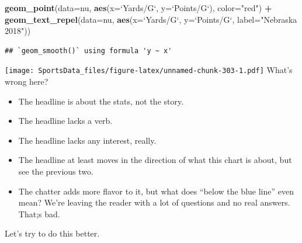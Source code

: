 \documentclass[
]{book}
\newenvironment{Shaded}{\begin{snugshade}}{\end{snugshade}}
\newcommand{\DataTypeTok}[1]{\textcolor[rgb]{0.13,0.29,0.53}{#1}}
\newcommand{\KeywordTok}[1]{\textcolor[rgb]{0.13,0.29,0.53}{\textbf{#1}}}
\newcommand{\NormalTok}[1]{#1}
\newcommand{\OperatorTok}[1]{\textcolor[rgb]{0.81,0.36,0.00}{\textbf{#1}}}
\newcommand{\StringTok}[1]{\textcolor[rgb]{0.31,0.60,0.02}{#1}}
\providecommand{\tightlist}{%
  \setlength{\itemsep}{0pt}\setlength{\parskip}{0pt}}
\begin{document}
\begin{Shaded}
\begin{Highlighting}[]
\StringTok{  }\KeywordTok{geom_point}\NormalTok{(}\DataTypeTok{data=}\NormalTok{nu, }\KeywordTok{aes}\NormalTok{(}\DataTypeTok{x=}\StringTok{`}\DataTypeTok{Yards/G}\StringTok{`}\NormalTok{, }\DataTypeTok{y=}\StringTok{`}\DataTypeTok{Points/G}\StringTok{`}\NormalTok{), }\DataTypeTok{color=}\StringTok{"red"}\NormalTok{) }\OperatorTok{+}\StringTok{ }
\StringTok{  }\KeywordTok{geom_text_repel}\NormalTok{(}\DataTypeTok{data=}\NormalTok{nu, }\KeywordTok{aes}\NormalTok{(}\DataTypeTok{x=}\StringTok{`}\DataTypeTok{Yards/G}\StringTok{`}\NormalTok{, }\DataTypeTok{y=}\StringTok{`}\DataTypeTok{Points/G}\StringTok{`}\NormalTok{, }\DataTypeTok{label=}\StringTok{"Nebraska 2018"}\NormalTok{))}
\end{Highlighting}
\end{Shaded}

\begin{verbatim}
## `geom_smooth()` using formula 'y ~ x'
\end{verbatim}

\texttt{[image: SportsData\_files/figure-latex/unnamed-chunk-303-1.pdf]}
What's wrong here?

\begin{itemize}
\tightlist
\item
  The headline is about the stats, not the story.
\item
  The headline lacks a verb.
\item
  The headline lacks any interest, really.
\item
  The headline at least moves in the direction of what this chart is about, but see the previous two.
\item
  The chatter adds more flavor to it, but what does ``below the blue line'' even mean? We're leaving the reader with a lot of questions and no real answers. That;s bad.
\end{itemize}

Let's try to do this better.
\end{document}
